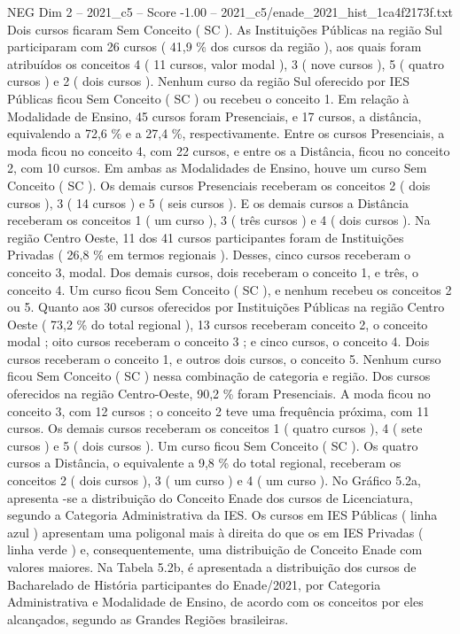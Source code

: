 \begin{textsample}{NEG Dim 2 – 2021\_c5 – Score -1.00 – 2021\_c5/enade\_2021\_hist\_1ca4f2173f.txt}
Dois cursos ficaram Sem Conceito ( SC ).
As Instituições Públicas na região Sul participaram com 26 cursos ( 41,9 \% dos cursos da região ), aos quais foram atribuídos os conceitos 4 ( 11 cursos, valor modal ), 3 ( nove cursos ), 5 ( quatro cursos ) e 2 ( dois cursos ).
Nenhum curso da região Sul oferecido por IES Públicas ficou Sem Conceito ( SC ) ou recebeu o conceito 1.
Em relação à Modalidade de Ensino, 45 cursos foram Presenciais, e 17 cursos, a distância, equivalendo a 72,6 \% e a 27,4 \%, respectivamente.
Entre os cursos Presenciais, a moda ficou no conceito 4, com 22 cursos, e entre os a Distância, ficou no conceito 2, com 10 cursos.
Em ambas as Modalidades de Ensino, houve um curso Sem Conceito ( SC ).
Os demais cursos Presenciais receberam os conceitos 2 ( dois cursos ), 3 ( 14 cursos ) e 5 ( seis cursos ).
E os demais cursos a Distância receberam os conceitos 1 ( um curso ), 3 ( três cursos ) e 4 ( dois cursos ).
Na região Centro Oeste, 11 dos 41 cursos participantes foram de Instituições Privadas ( 26,8 \% em termos regionais ).
Desses, cinco cursos receberam o conceito 3, modal.
Dos demais cursos, dois receberam o conceito 1, e três, o conceito 4.
Um curso ficou Sem Conceito ( SC ), e nenhum recebeu os conceitos 2 ou 5.
Quanto aos 30 cursos oferecidos por Instituições Públicas na região Centro Oeste ( 73,2 \% do total regional ), 13 cursos receberam conceito 2, o conceito modal ; oito cursos receberam o conceito 3 ; e cinco cursos, o conceito 4.
Dois cursos receberam o conceito 1, e outros dois cursos, o conceito 5.
Nenhum curso ficou Sem Conceito ( SC ) nessa combinação de categoria e região.
Dos cursos oferecidos na região Centro-Oeste, 90,2 \% foram Presenciais.
A moda ficou no conceito 3, com 12 cursos ; o conceito 2 teve uma frequência próxima, com 11 cursos.
Os demais cursos receberam os conceitos 1 ( quatro cursos ), 4 ( sete cursos ) e 5 ( dois cursos ).
Um curso ficou Sem Conceito ( SC ).
Os quatro cursos a Distância, o equivalente a 9,8 \% do total regional, receberam os conceitos 2 ( dois cursos ), 3 ( um curso ) e 4 ( um curso ).
No Gráfico 5.2a, apresenta -se a distribuição do Conceito Enade dos cursos de Licenciatura, segundo a Categoria Administrativa da IES.
Os cursos em IES Públicas ( linha azul ) apresentam uma poligonal mais à direita do que os em IES Privadas ( linha verde ) e, consequentemente, uma distribuição de Conceito Enade com valores maiores.
Na Tabela 5.2b, é apresentada a distribuição dos cursos de Bacharelado de História participantes do Enade/2021, por Categoria Administrativa e Modalidade de Ensino, de acordo com os conceitos por eles alcançados, segundo as Grandes Regiões brasileiras.

\end{textsample}
